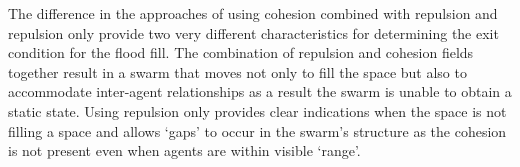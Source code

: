 The difference in the approaches of using cohesion combined with repulsion and repulsion only provide two very different characteristics for determining the exit condition for the flood fill. The combination of repulsion and cohesion fields together result in a swarm that moves not only to fill the space but also to accommodate inter-agent relationships as a result the swarm is unable to obtain a static state. Using repulsion only provides clear indications when the space is not filling a space and allows `gaps' to occur in the swarm's structure as the cohesion is not present even when agents are within visible `range'.